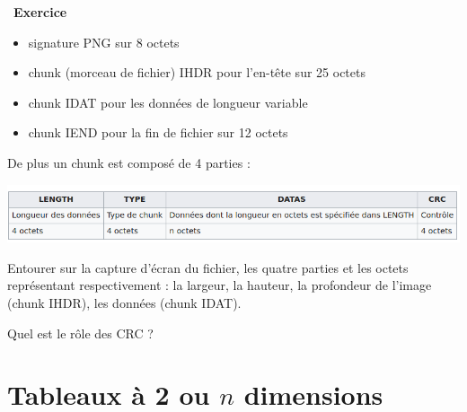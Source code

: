 \documentclass[a4paper, french, 12pt]{article}
\newcounter{exo}
\newenvironment{exercice}[1]
{\par \medskip   \addtocounter{exo}{1} \noindent  
\begin{bclogo}[arrondi =0.1,   noborder = true, logo=\bccrayon, marge=4]{~\textbf{Exercice} \textbf{\theexo} {\itshape #1} }  \par}
{
\end{bclogo}
 \par \bigskip }
\begin{document}
\begin{exercice}{}
\begin{enumerate}
\begin{enumerate}
\begin{itemize}
	\item signature PNG sur 8 octets
     \item chunk (morceau de fichier) IHDR pour l'en-tête sur  25 octets
     \item chunk IDAT pour les données de longueur variable
     \item chunk IEND pour la fin de fichier sur 12 octets
 \end{itemize}

De plus un chunk est composé de 4 parties :

\begin{center}
\includegraphics[scale=0.55]{images/chunk-png.png}
\end{center}


Entourer sur la capture d'écran  du fichier, les quatre parties  et les octets représentant respectivement : la largeur, la hauteur, la profondeur de l'image (chunk IHDR), les données (chunk IDAT).

Quel est le rôle des CRC ?


\end{enumerate}
\end{enumerate}



\end{exercice}



\section{Tableaux à 2 ou $n$ dimensions}

\vspace*{-20pt}
\end{document}
